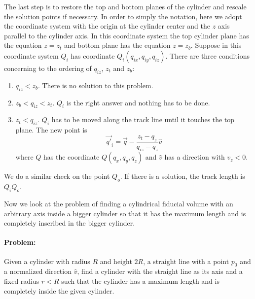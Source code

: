 The last step is to restore the top and bottom planes of the cylinder and rescale the solution points if necessary. In order to simply the notation, here we adopt the coordinate system with the origin at the cylinder center and the $z$ axis parallel to the cylinder axis. In this coordinate system the top cylinder plane has the equation $z=z_t$ and bottom plane has the equation $z=z_b$. Suppose in this coordinate system $Q_i$ has coordinate $Q_i(q_{ix},q_{iy},q_{iz})$. There are three conditions concerning to the ordering of $q_{iz}$, $z_t$ and $z_b$:
\begin{enumerate}
	\item $q_{iz}<z_b$. There is no solution to this problem.
	\item $z_b<q_{iz}<z_t$. $Q_i$ is the right answer and nothing has to be done.
	\item $z_t<q_{iz}$. $Q_i$ has to be moved along the track line until it touches the top plane. The new point is
	\begin{equation}
		\vec{q'}_i=\vec{q}-\frac{z_t-q_z}{q_{iz}-q_z}\hat{v}
	\end{equation}
	where $Q$ has the coordinate $Q(q_x,q_y,q_z)$ and $\hat{v}$ has a direction with $v_z<0$.
\end{enumerate}

We do a similar check on the point $Q_o$. If there is a solution, the track length is $\overline{Q_iQ_o}$.

Now we look at the problem of finding a cylindrical fiducial volume with an arbitrary axis inside a bigger cylinder so that it has the maximum length and is completely inscribed in the bigger cylinder.

\paragraph{Problem:} Given a cylinder with radius $R$ and height $2R$, a straight line with a point $p_0$ and a normalized direction $\hat{v}$, find a cylinder with the straight line as its axis and a fixed radius $r<R$ such that the cylinder has a maximum  length and is completely inside the given cylinder.

